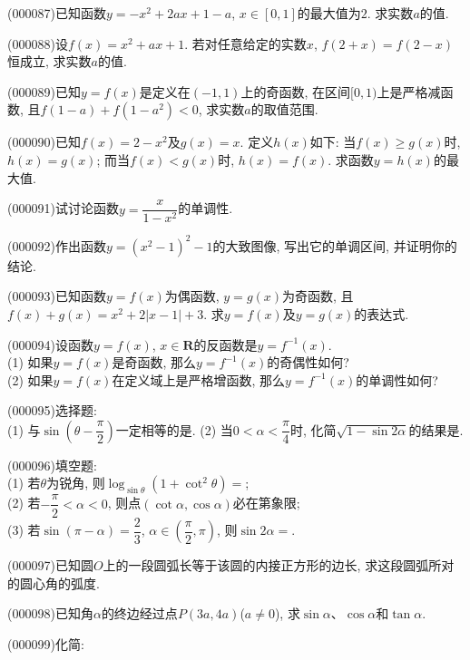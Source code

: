 \item (000087)已知函数$y=-x^2+2ax+1-a$, $x\in [0, 1]$的最大值为$2$. 求实数$a$的值.
\item (000088)设$f(x)=x^2+ax+1$. 若对任意给定的实数$x$, $f(2+x)=f(2-x)$恒成立, 求实数$a$的值.
\item (000089)已知$y=f(x)$是定义在$(-1, 1)$上的奇函数, 在区间$[0, 1)$上是严格减函数, 且$f(1-a)+f(1-a^2)<0$, 求实数$a$的取值范围.
\item (000090)已知$f(x)=2-x^2$及$g(x)=x$. 定义$h(x)$如下: 当$f(x)\ge g(x)$时, $h(x)=g(x)$; 而当$f(x)<g(x)$时, $h(x)=f(x)$. 求函数$y=h(x)$的最大值.
\item (000091)试讨论函数$y=\dfrac{x}{1-x^2}$的单调性.
\item (000092)作出函数$y=(x^2-1)^2-1$的大致图像, 写出它的单调区间, 并证明你的结论.
\item (000093)已知函数$y=f(x)$为偶函数, $y=g(x)$为奇函数, 且$f(x)+g(x)=x^2+2|x-1|+3$. 求$y=f(x)$及$y=g(x)$的表达式.
\item (000094)设函数$y=f(x)$, $x\in \mathbf{R}$的反函数是$y=f^{-1}(x)$.\\
(1) 如果$y=f(x)$是奇函数, 那么$y=f^{-1}(x)$的奇偶性如何?\\
(2) 如果$y=f(x)$在定义域上是严格增函数, 那么$y=f^{-1}(x)$的单调性如何?
\item (000095)选择题:\\
(1) 与$\sin(\theta -\dfrac\pi 2)$一定相等的是.
(2) 当$0<\alpha<\dfrac\pi 4$时, 化简$\sqrt{1-\sin 2\alpha}$的结果是.
\fourch{$\cos \alpha$}{$\sin \alpha-\cos \alpha$}{$\cos\alpha-\sin\alpha$}{$\sin\alpha+\cos\alpha$}
\item (000096)填空题:\\
(1) 若$\theta$为锐角, 则$\log_{\sin \theta} (1+\cot^2\theta)=$;\\
(2) 若$-\dfrac\pi 2<\alpha<0$, 则点$(\cot \alpha, \cos \alpha)$必在第象限;\\
(3) 若$\sin (\pi -\alpha)=\dfrac 23$, $\alpha\in (\dfrac\pi 2, \pi)$, 则$\sin 2\alpha=$.
\item (000097)已知圆$O$上的一段圆弧长等于该圆的内接正方形的边长, 求这段圆弧所对的圆心角的弧度.
\item (000098)已知角$\alpha$的终边经过点$P(3a, 4a)$($a\ne 0$), 求$\sin \alpha$、$\cos \alpha$和$\tan \alpha$.
\item (000099)化简:\\
